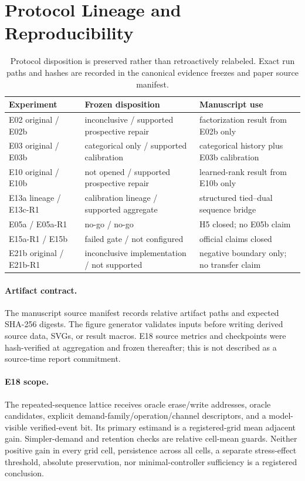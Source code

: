 \section{Protocol Lineage and Reproducibility}
\label{app:lineage}

\begin{table}[t]
  \centering
  \small
  \begin{tabular}{lll}
    \toprule
    Experiment & Frozen disposition & Manuscript use\\
    \midrule
    E02 original / E02b & inconclusive / supported prospective repair
      & factorization result from E02b only\\
    E03 original / E03b & categorical only / supported calibration
      & categorical history plus E03b calibration\\
    E10 original / E10b & not opened / supported prospective repair
      & learned-rank result from E10b only\\
    E13a lineage / E13c-R1 & calibration lineage / supported aggregate
      & structured tied--dual sequence bridge\\
    E05a / E05a-R1 & no-go / no-go
      & H5 closed; no E05b claim\\
    E15a-R1 / E15b & failed gate / not configured
      & official claims closed\\
    E21b original / E21b-R1 & inconclusive implementation / not supported
      & negative boundary only; no transfer claim\\
    \bottomrule
  \end{tabular}
  \caption{Protocol disposition is preserved rather than retroactively
  relabeled. Exact run paths and hashes are recorded in the canonical evidence
  freezes and paper source manifest.}
  \label{tab:lineage}
\end{table}

\paragraph{Artifact contract.}
The manuscript source manifest records relative artifact paths and expected
SHA-256 digests.  The figure generator validates inputs before writing
derived source data, SVGs, or result macros.  E18 source metrics and
checkpoints were hash-verified at aggregation and frozen thereafter; this is
not described as a source-time report commitment.

\paragraph{E18 scope.}
The repeated-sequence lattice receives oracle erase/write addresses, oracle
candidates, explicit demand-family/operation/channel descriptors, and a
model-visible verified-event bit.  Its primary estimand is a registered-grid
mean adjacent gain.  Simpler-demand and retention checks are relative
cell-mean guards.  Neither positive gain in every grid cell, persistence
across all cells, a separate stress-effect threshold, absolute preservation,
nor minimal-controller sufficiency is a registered conclusion.

